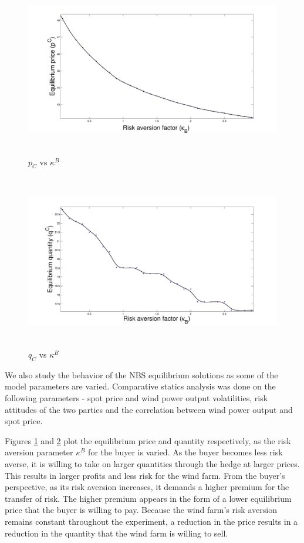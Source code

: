 \begin{figure}[htb]
	\begin{center}
		\includegraphics[height=3in]{figures/p_kb.pdf}
		\caption{$p_C$ vs $\kappa^B$} \label{pckb}
	\end{center}
\end{figure}
\begin{figure}[htb]
	\begin{center}
		\includegraphics[height=3in]{figures/q_kb.pdf}
		\caption{$q_C$ vs $\kappa^B$} \label{qckb}
	\end{center}
\end{figure}

We also study the behavior of the NBS equilibrium solutions as some of the model
parameters are varied. Comparative statics analysis was done on the following
parameters - spot price and wind power output volatilities, risk attitudes of
the two parties and the correlation between wind power output and spot price. 

Figures \ref{pckb} and \ref{qckb} plot the equilibrium price and quantity
respectively, as the risk aversion parameter $\kappa^B$ for the buyer is varied.
As the buyer becomes less risk averse, it is willing to take on larger
quantities through the hedge at larger prices.  This results in larger profits
and less risk for the wind farm. From the buyer's perspective, as its risk
aversion increases, it demands a higher premium for the transfer of risk. The
higher premium appears in the form of a lower equilibrium price that the buyer
is willing to pay. Because the wind farm's risk aversion remains constant
throughout the experiment, a reduction in the price results in a reduction in
the quantity that the wind farm is willing to sell.

